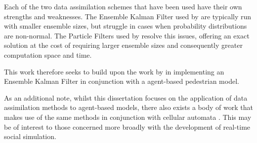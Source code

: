 Each of the two data assimilation schemes that have been used have their own
strengths and weaknesses.
The Ensemble Kalman Filter used by \citet{ward2016dynamic} are typically run
with smaller ensemble sizes, but struggle in cases when probability
distributions are non-normal. 
The Particle Filters used by \citet{wang2013data, rai2013behavior,
wang2015data} resolve this issues, offering an exact solution at the cost of
requiring larger ensemble sizes and consequently greater computation space and
time.

This work therefore seeks to build upon the work by \citet{ward2016dynamic} in
implementing an Ensemble Kalman Filter in conjunction with a agent-based
pedestrian model.

As an additional note, whilst this dissertation focuses on the application of
data assimilation methods to agent-based models, there also exists a body of
work that makes use of the same methods in conjunction with cellular automata
\citep{li2012assimilating, li2017exploring}.
This may be of interest to those concerned more broadly with the development of
real-time social simulation.


